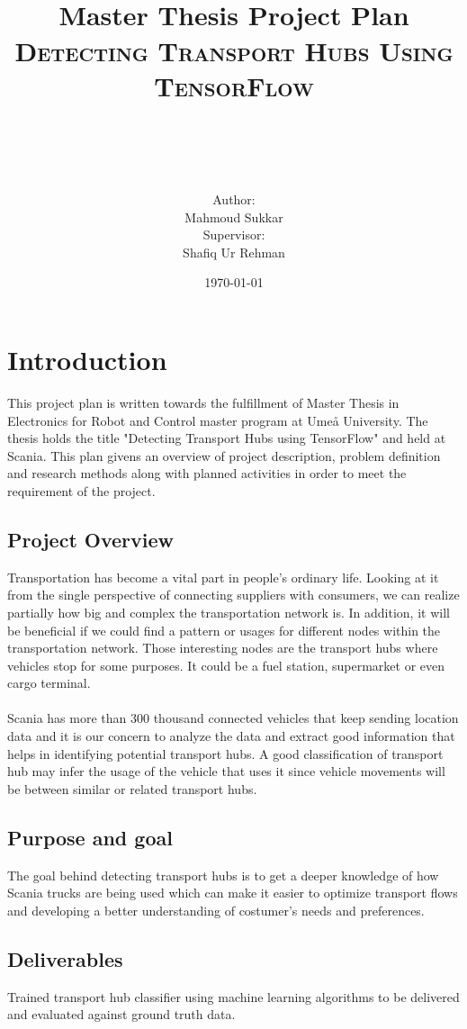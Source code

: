 \documentclass[paper=a4, fontsize=10pt,margin=0.2in]{scrartcl}
\title{
		\vspace{1in} 	
		\usefont{OT1}{bch}{b}{n}
		\horrule{0.5pt} \\[0.4cm]
		\huge  Master Thesis Project Plan\\ [0.4cm]
        \normalfont \large \textsc{Detecting Transport Hubs Using TensorFlow} \\ [20pt]
		\horrule{0.5pt} \\[10pt]
        \
}
\author{
		Author: \\
		\normalfont \normalsize Mahmoud Sukkar \\ [2cm] Supervisor: \\ \normalfont \normalsize Shafiq Ur Rehman \\ [2cm]}
\date{\today}
\numberwithin{equation}{section}		%
\numberwithin{figure}{section}			%
\numberwithin{table}{section}				%
\begin{document}
\maketitle
\pagebreak
\tableofcontents
\newpage

\section{Introduction}
This project plan is written towards the fulfillment of Master Thesis in Electronics for Robot and Control master program at Umeå University.
The thesis holds the title "Detecting Transport Hubs using TensorFlow" and held at Scania. This plan givens an overview of project description, problem definition and research methods along with planned activities in order to meet the requirement of the project.
\subsection{Project Overview}
Transportation has become a vital part in people's ordinary life. Looking at it from the single perspective of connecting suppliers with consumers, we can realize partially how big and complex the transportation network is. In addition, it will be beneficial if we could find a pattern or usages for different nodes within the transportation network. Those interesting nodes are the transport hubs where vehicles stop for some purposes. It could be a fuel station, supermarket or even cargo terminal.  \\ \\
Scania has more than 300 thousand connected vehicles that keep sending location data and it is our concern to analyze the data and extract good information that helps in identifying potential transport hubs. A good classification of transport hub may infer the usage of the vehicle that uses it since vehicle movements will be between similar or related transport hubs.     

\subsection{Purpose and goal}
The goal behind detecting transport hubs is to get a deeper knowledge of how Scania trucks are being used which can make it easier to optimize transport flows and developing a better understanding of costumer's needs and preferences.
\subsection{Deliverables}
Trained transport hub classifier using machine learning algorithms to be delivered and evaluated against ground truth data. \\ 
\end{document}
